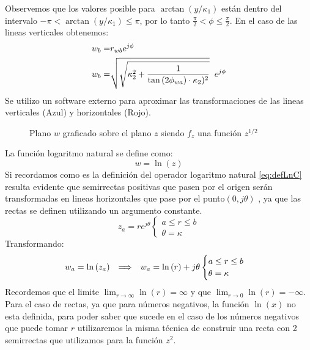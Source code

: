 Observemos que los valores posible para $\arctan{(y/\kappa_1)}$ están dentro del intervalo $-\pi<\arctan{(y/\kappa_1)}\leq\pi$, por lo tanto $\frac{\pi}{2}<\phi\leq\frac{\pi}{2}$.
En el caso de las lineas verticales obtenemos:
\begin{equation}
    \begin{aligned}
        w_b=&r_{wb}e^{j\phi}\\
        w_b=&\sqrt{\sqrt{\kappa_2^2+\frac{1}{\tan{(2\phi_{wa})}\cdot\kappa_2)^2}}} \hspace{0.2cm}e^{j\phi}
    \end{aligned}
\end{equation}
Se utilizo un software externo para aproximar las transformaciones de las lineas verticales (Azul) y horizontales (Rojo).
\begin{figure}[H]
    \centering
    \caption{Plano $w$ graficado sobre el plano $z$ siendo $f_{z}$ una función $z^{1/2}$}
    \label{fig:z^0.5cf}
\end{figure}
La función logaritmo natural se define como:
\begin{equation}
    w=\ln{(z)}
\end{equation}
Si recordamos como es la definición del operador logaritmo natural \ref{eq:defLnC} resulta evidente que semirrectas positivas que pasen por el origen serán transformadas en lineas horizontales que pase por el punto$(0,j\theta)$  , ya que las rectas se definen utilizando un argumento constante.
\begin{equation}
    z_a=re^{j\theta}\begin{cases}
        a\leq r\leq b\\
        \theta=\kappa
    \end{cases}
\end{equation}
Transformando:
\begin{equation}
    w_a=\ln{(z_a)}\hspace{0.25cm} \Longrightarrow \hspace{0.25cm} w_a=\ln{(r)}+j\theta\begin{cases}
        a\leq r\leq b\\
        \theta=\kappa
    \end{cases}
\end{equation}
Recordemos que el limite $\lim_{r\to\infty}\ln{(r)}=\infty$ y que $\lim_{r\to 0}\ln{(r)}=-\infty$. 
Para el caso de rectas, ya que para números negativos, la función $\ln{(x)}
$ no esta definida, para poder saber que sucede en el caso de los números negativos que puede tomar $r$ utilizaremos la misma técnica de construir una recta con 2 semirrectas que utilizamos para la función $z^2$.
